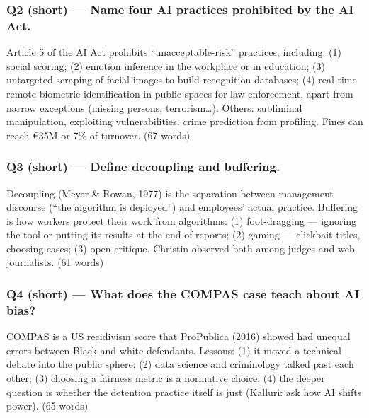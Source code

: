 \documentclass[11pt,a4paper]{article}
\begin{document}
\subsubsection*{Q2 (short) — Name four AI practices prohibited by the AI Act.}
Article 5 of the AI Act prohibits “unacceptable-risk” practices, including: (1) social scoring; (2) emotion inference in the workplace or in education; (3) untargeted scraping of facial images to build recognition databases; (4) real-time remote biometric identification in public spaces for law enforcement, apart from narrow exceptions (missing persons, terrorism…). Others: subliminal manipulation, exploiting vulnerabilities, crime prediction from profiling. Fines can reach €35M or 7\% of turnover. {\small\color{gray}(67 words)}
\subsubsection*{Q3 (short) — Define decoupling and buffering.}
Decoupling (Meyer \& Rowan, 1977) is the separation between management discourse (“the algorithm is deployed”) and employees’ actual practice. Buffering is how workers protect their work from algorithms: (1) foot-dragging — ignoring the tool or putting its results at the end of reports; (2) gaming — clickbait titles, choosing cases; (3) open critique. Christin observed both among judges and web journalists. {\small\color{gray}(61 words)}
\subsubsection*{Q4 (short) — What does the COMPAS case teach about AI bias?}
COMPAS is a US recidivism score that ProPublica (2016) showed had unequal errors between Black and white defendants. Lessons: (1) it moved a technical debate into the public sphere; (2) data science and criminology talked past each other; (3) choosing a fairness metric is a normative choice; (4) the deeper question is whether the detention practice itself is just (Kalluri: ask how AI shifts power). {\small\color{gray}(65 words)}
\end{document}
